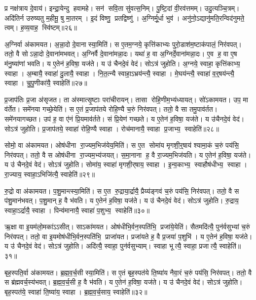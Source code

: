 प्र नक्ष॑त्राय दे॒वाय॑।
इन्द्रा॒येन्दु हवामहे।
सन॑ सवि॒ता सु॑वत्स॒निम्।
पु॒ष्टि॒दां वी॒रव॑त्तमम्।
उदु॒त्यञ्चि॒त्रम्।
अदि॑तिर्न उरुष्यतु म॒हीमू॒ षु मा॒तरम्।
इ॒दं विष्णु॒ प्रतद्विष्णु॑।
अ॒ग्निर्मू॒र्धा भुव॑।
अनु॑नो॒ऽद्यानु॑मति॒रन्विद॑नुमते॒ त्वम्।
ह॒व्य॒वाह॒ स्वि॑ष्टम्॥२६॥\anuvakamend[आ॒य॒त्य॑गम॒त्स्वि॑ष्टम्]

अ॒ग्निर्वा अ॑कामयत।
अ॒न्ना॒दो दे॒वानास्या॒मिति॑।
स ए॒तम॒ग्नये॒ कृत्ति॑काभ्यः पुरो॒डाश॑म॒ष्टाक॑पालं॒ निर॑वपत्।
ततो॒ वै सोऽन्ना॒दो दे॒वाना॑मभवत्।
अ॒ग्निर्वै दे॒वाना॑मन्ना॒दः।
यथा॑ ह॒ वा अ॒ग्निर्दे॒वाना॑मन्ना॒दः।
ए॒व ह॒ वा ए॒ष म॑नु॒ष्या॑णां भवति।
य ए॒तेन॑ ह॒विषा॒ यज॑ते।
य उ॑ चैनदे॒वं वेद॑।
सोऽत्र॑ जुहोति।
अ॒ग्नये॒ स्वाहा॒ कृत्ति॑काभ्य॒ स्वाहा।
अ॒म्बायै॒ स्वाहा॑ दु॒लायै॒ स्वाहा।
नि॒त॒त्न्यै स्वाहा॒ऽभ्रय॑न्त्यै॒ स्वाहा।
मे॒घय॑न्त्यै॒ स्वाहा॑ व॒र्॒षय॑न्त्यै॒ स्वाहा।
चु॒पु॒णीका॑यै॒ स्वाहेति॑॥२७॥

प्र॒जाप॑तिः प्र॒जा अ॑सृजत।
ता अ॑स्मात्सृ॒ष्टाः परा॑चीरायन्।
तासा रोहि॒णीम॒भ्य॑ध्यायत्।
सो॑ऽकामयत।
उप॒ मा व॑र्तेत।
समे॑नया गच्छे॒येति॑।
स ए॒तं प्र॒जाप॑तये रोहि॒ण्यै च॒रुं निर॑वपत्।
ततो॒ वै सा तमु॒पाव॑र्तत।
समे॑नयागच्छत।
उप॑ ह॒ वा ए॑नं प्रि॒यमाव॑र्तते।
सं प्रि॒येण॑ गच्छते।
य ए॒तेन॑ ह॒विषा॒ यज॑ते।
य उ॑चैनदे॒वं वेद॑।
सोऽत्र॑ जुहोति।
प्र॒जाप॑तये॒ स्वाहा॑ रोहि॒ण्यै स्वाहा।
रोच॑मानायै॒ स्वाहा प्र॒जाभ्य॒ स्वाहेति॑॥२८॥

सोमो॒ वा अ॑कामयत।
ओष॑धीना रा॒ज्यम॒भिज॑येय॒मिति॑।
स ए॒त सोमा॑य मृगशी॒र्॒षाय॑ श्यामा॒कं च॒रुं पय॑सि॒ निर॑वपत्।
ततो॒ वै स ओष॑धीना रा॒ज्यम॒भ्य॑जयत्।
स॒मा॒नाना ह॒ वै रा॒ज्यम॒भिज॑यति।
य ए॒तेन॑ ह॒विषा॒ यज॑ते।
य उ॑ चैनदे॒वं वेद॑।
सोऽत्र॑ जुहोति।
सोमा॑य॒ स्वाहा॑ मृगशी॒र्‌षाय॒ स्वाहा।
इ॒न्व॒काभ्य॒ स्वाहौष॑धीभ्य॒ स्वाहा।
रा॒ज्याय॒ स्वाहा॒ऽभिजि॑त्यै॒ स्वाहेति॑॥२९॥

रु॒द्रो वा अ॑कामयत।
प॒शु॒मान्त्स्या॒मिति॑।
स ए॒त रु॒द्राया॒र्द्रायै॒ प्रैय्य॑ङ्गवं च॒रुं पय॑सि॒ निर॑वपत्।
ततो॒ वै स प॑शु॒मान॑भवत्।
प॒शु॒मान् ह॒ वै भ॑वति।
य ए॒तेन॑ ह॒विषा॒ यज॑ते।
य उ॑ चैनदे॒वं वेद॑।
सोऽत्र॑ जुहोति।
रु॒द्राय॒ स्वाहा॒ऽर्द्रायै॒ स्वाहा।
पिन्व॑मानायै॒ स्वाहा॑ प॒शुभ्य॒ स्वाहेति॑॥३०॥

ऋ॒क्षा वा इ॒यम॑लो॒मका॑ऽऽसीत्।
साऽका॑मयत।
ओष॑धीभि॒र्वन॒स्पति॑भि॒ प्रजा॑ये॒येति॑।
सैतमदि॑त्यै॒ पुन॑र्वसुभ्यां च॒रुं निर॑वपत्।
ततो॒ वा इ॒यमोष॑धीभि॒र्वन॒स्पति॑भि॒ प्राजा॑यत।
प्रजा॑यते ह॒ वै प्र॒जया॑ प॒शुभि॑।
य ए॒तेन॑ ह॒विषा॒ यज॑ते।
य उ॑ चैनदे॒वं वेद॑।
सोऽत्र॑ जुहोति।
अदि॑त्यै॒ स्वाहा॒ पुन॑र्वसुभ्याम्।
स्वाहा भूत्यै॒ स्वाहा॒ प्रजात्यै॒ स्वाहेति॑॥३१॥

बृह॒स्पति॒र्वा अ॑कामयत।
ब्र॒ह्म॒व॒र्च॒सी स्या॒मिति॑।
स ए॒तं बृह॒स्पत॑ये ति॒ष्या॑य नैवा॒रं च॒रुं पय॑सि॒ निर॑वपत्।
ततो॒ वै स ब्र॑ह्मवर्च॒स्य॑भवत्।
ब्र॒ह्म॒व॒र्च॒सी ह॒ वै भ॑वति।
य ए॒तेन॑ ह॒विषा॒ यज॑ते।
य उ॑ चैनदे॒वं वेद॑।
सोऽत्र॑ जुहोति।
बृह॒स्पत॑ये॒ स्वाहा॑ ति॒ष्या॑य॒ स्वाहा।
ब्र॒ह्म॒व॒र्च॒साय॒ स्वाहेति॑॥३२॥

